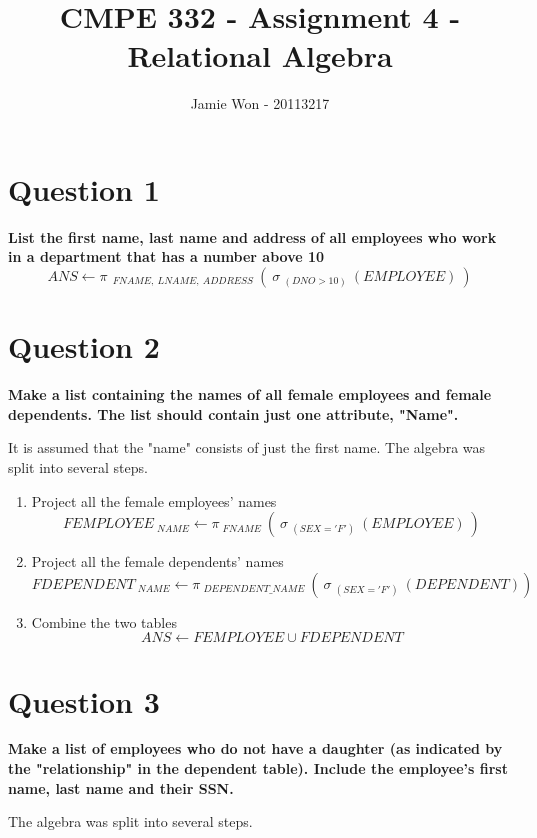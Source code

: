 \documentclass{article}
\title{CMPE 332 - Assignment 4 - Relational Algebra}
\author{Jamie Won - 20113217}
\begin{document}
\setcounter{secnumdepth}{0}
\maketitle
\tableofcontents
\cleardoublepage

\section{Question 1}

    \textbf{List the first name, last name and address of all employees who work in a department that has a number above 10}
    \[ ANS \gets \pi \: _{\: FNAME, \: LNAME, \: ADDRESS} \: ( \: \sigma \: _{(DNO > 10)} \: (EMPLOYEE) \: )\]

\section{Question 2}

    \textbf{Make a list containing the names of all female employees and female dependents.  The list should contain just one attribute, "Name".}

    It is assumed that the "name" consists of just the first name. The algebra was split into several steps.
    
    \begin{enumerate}
        \item Project all the female employees' names
        \[ FEMPLOYEE \: _{NAME} \gets \pi \: _{FNAME} \: ( \: \sigma \: _{(SEX = 'F')} \: (EMPLOYEE) \: )\]
        \item Project all the female dependents' names
        \[ FDEPENDENT \: _{NAME} \gets \pi \: _{DEPENDENT\_NAME} \: ( \: \sigma \: _{(SEX = 'F')} \: (DEPENDENT)) \: \]
        \item Combine the two tables
        \[ ANS \gets FEMPLOYEE \cup FDEPENDENT \]
    \end{enumerate}
    
\section{Question 3}

    \textbf{Make a list of employees who do not have a daughter (as indicated by the "relationship" in the dependent table).  Include the employee's first name, last name and their SSN.}

    The algebra was split into several steps.
    
\end{document}
